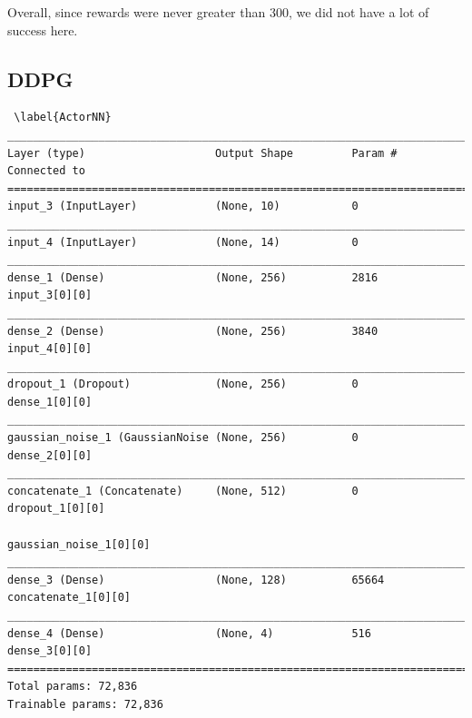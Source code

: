 \documentclass[man, 12pt]{apa6}
\begin{document}
Overall, since rewards were never greater than 300, we did not have a lot of success here. 
\subsection{DDPG}

\begin{verbatim} \label{ActorNN}
_________________________________________________________________________________________________
Layer (type)                    Output Shape         Param #     Connected to                     
==================================================================================================
input_3 (InputLayer)            (None, 10)           0                                            
__________________________________________________________________________________________________
input_4 (InputLayer)            (None, 14)           0                                            
__________________________________________________________________________________________________
dense_1 (Dense)                 (None, 256)          2816        input_3[0][0]                    
__________________________________________________________________________________________________
dense_2 (Dense)                 (None, 256)          3840        input_4[0][0]                    
__________________________________________________________________________________________________
dropout_1 (Dropout)             (None, 256)          0           dense_1[0][0]                    
__________________________________________________________________________________________________
gaussian_noise_1 (GaussianNoise (None, 256)          0           dense_2[0][0]                    
__________________________________________________________________________________________________
concatenate_1 (Concatenate)     (None, 512)          0           dropout_1[0][0]                  
                                                                 gaussian_noise_1[0][0]           
__________________________________________________________________________________________________
dense_3 (Dense)                 (None, 128)          65664       concatenate_1[0][0]              
__________________________________________________________________________________________________
dense_4 (Dense)                 (None, 4)            516         dense_3[0][0]                    
==================================================================================================
Total params: 72,836
Trainable params: 72,836

\end{verbatim}
\end{document}
